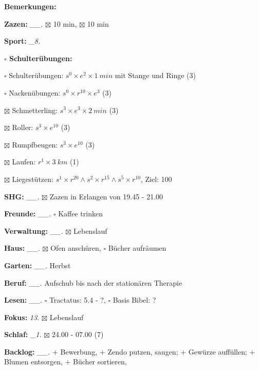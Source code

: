 \documentclass[10pt,a4paper]{article}
\newcommand\prop[1] {{\color {alizarin} {\bf #1}}}             %
\newcommand\mand[1] {{\color {burntorange} {\bf #1}}}          %
\newcommand\topspace{\vskip -15pt \hskip 20pt}
\newcommand\bottomspace{\vskip 4pt}
\newcommand\n[1] { {\sl #1.} \hskip 5pt }
\begin{document}
\begin{mdframed}[style=daystyle]
\begin{labeling}{{\mand {Bemerkungen:}}}
  \item[{\mand {Zazen:}}]        \n{\_\_} $\boxtimes$ 10 min, $\boxtimes$ 10 min
  \item[{\mand {Sport:}}]         \n{\_8}
    \topspace
    \begin{minipage}{0.75\textwidth}  
      \begin{labeling}{\prop {$\square$ {Schulterübungen:}}} 
        \setlength\itemsep{-3pt}
      \item[$\square$ Schulterübungen:] $s^0 \times e^2 \times 1\ min$ mit Stange und Ringe (3)
      \item[$\square$ Nackenübungen:]   $s^0 \times r^{10} \times e^3$ (3)
      \item[$\boxtimes$ Schmetterling:]   $s^3 \times e^3 \times 2\ min$ (3)
      \item[$\boxtimes$ Roller:]          $s^3 \times e^{10}$ (3)
      \item[$\boxtimes$ Rumpfbeugen:]     $s^3 \times e^{10}$ (3)
      \item[$\boxtimes$ Laufen:]          $r^1 \times 3\ km$ (1)
      \item[$\boxtimes$ Liegestützen:]    $s^1 \times r^{20} \land s^2 \times r^{15} \land s^5 \times r^{10}$,
          Ziel: 100
      \end{labeling}
    \end{minipage}
    \bottomspace        
  \item[{\mand {SHG:}}]          \n{\_\_} $\boxtimes$ Zazen in Erlangen von 19.45 - 21.00
  \item[{\mand {Freunde:}}]      \n{\_\_} $\square$ Kaffee trinken
  \item[{\mand {Verwaltung:}}]   \n{\_\_} $\boxtimes$ Lebenslauf
  \item[{\mand {Haus:}}]         \n{\_\_} $\boxtimes$ Ofen anschüren, $\square$ Bücher aufräumen
  \item[{\mand {Garten:}}]       \n{\_\_} Herbst
  \item[{\mand {Beruf:}}]        \n{\_\_} Aufschub bis nach der stationären Therapie
  \item[{\mand {Lesen:}}]        \n{\_\_} $\square$ Tractatus: 5.4 - ?, $\square$ Basis Bibel: ?
  \item[{\mand {Fokus:}}]          \n{13} $\boxtimes$ Lebenslauf
  \item[{\mand {Schlaf:}}]        \n{\_1} $\boxtimes$ 24.00 - 07.00 (7)
  \item[{\mand {Backlog:}}]      \n{\_\_} 
    $+$ Bewerbung,
    $+$ Zendo putzen, saugen; $+$ Gewürze auffüllen; $+$ Blumen entsorgen, $+$ Bücher sortieren,

\end{labeling}
\end{mdframed}
\end{document}
